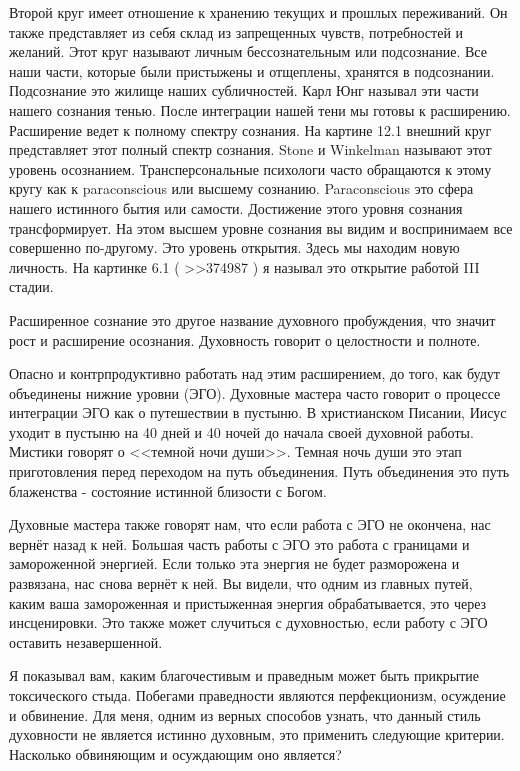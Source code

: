 \documentclass[10pt, fleqn]{article}
\begin{document}
Второй круг имеет отношение к хранению текущих и прошлых переживаний. Он также представляет из себя склад из запрещенных чувств, потребностей и желаний. Этот круг называют личным бессознательным или подсознание. Все наши части, которые были пристыжены и отщеплены, хранятся в подсознании. Подсознание это жилище наших субличностей. Карл Юнг называл эти части нашего сознания тенью. После интеграции нашей тени мы готовы к расширению. Расширение ведет к полному спектру сознания. На картине 12.1 внешний круг представляет этот полный спектр сознания. Stone и Winkelman называют этот уровень осознанием. Трансперсональные психологи часто обращаются к этому кругу как к paraconscious или высшему сознанию. Paraconscious это сфера нашего истинного бытия или самости. Достижение этого уровня сознания трансформирует. На этом высшем уровне сознания вы видим и воспринимаем все совершенно по-другому. Это уровень открытия. Здесь мы находим новую личность. На картинке 6.1 ( >>374987 ) я называл это открытие работой III стадии. 


Расширенное сознание это другое название духовного пробуждения, что значит рост и расширение осознания. Духовность говорит о целостности и полноте.

Опасно и контрпродуктивно работать над этим расширением, до того, как будут объединены нижние уровни (ЭГО). Духовные мастера часто говорит о процессе интеграции ЭГО как о путешествии в пустыню. В христианском Писании, Иисус уходит в пустыню на 40 дней и 40 ночей до начала своей духовной работы. Мистики говорят о <<темной ночи души>>. Темная ночь души это этап приготовления перед переходом на путь объединения. Путь объединения это путь блаженства - состояние истинной близости с Богом.

Духовные мастера также говорят нам, что если работа с ЭГО не окончена, нас вернёт назад к ней. Большая часть работы с ЭГО это работа с границами и замороженной энергией. Если только эта энергия не будет разморожена и развязана, нас снова вернёт к ней. Вы видели, что одним из главных путей, каким ваша замороженная и пристыженная энергия обрабатывается, это через инсценировки. Это также может случиться с духовностью, если работу с ЭГО оставить незавершенной.



Я показывал вам, каким благочестивым и праведным может быть прикрытие токсического стыда. Побегами праведности являются перфекционизм, осуждение и обвинение. Для меня, одним из верных способов узнать, что данный стиль духовности не является истинно духовным, это применить следующие критерии. Насколько обвиняющим и осуждающим оно является?
\end{document}
